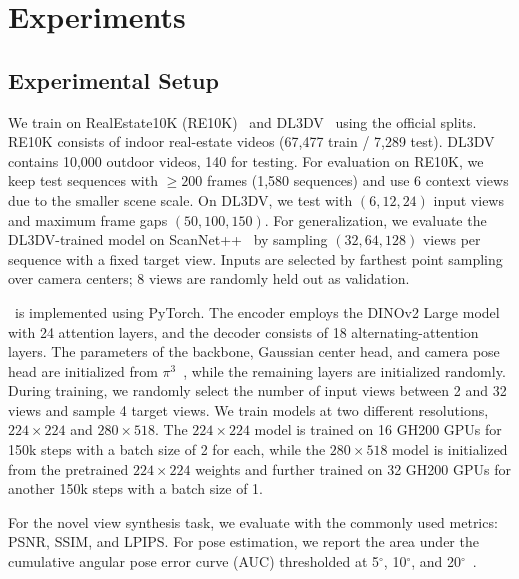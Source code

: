 
\vspace{-1mm}
\section{Experiments}
\vspace{-3mm}

\subsection{Experimental Setup}
\vspace{-3mm}



We train on RealEstate10K (RE10K)~\citep{re10k} and DL3DV~\citep{acid} using the official splits. RE10K consists of indoor real-estate videos (67,477 train / 7,289 test). DL3DV~\citep{dl3dv} contains 10,000 outdoor videos, 140 for testing.
For evaluation on RE10K, we keep test sequences with $\geq200$ frames (1,580 sequences) and use 6 context views due to the smaller scene scale. On DL3DV, we test with $(6,12,24)$ input views and maximum frame gaps $(50,100,150)$.
For generalization, we evaluate the DL3DV-trained model on ScanNet++~\citep{scannetpp} by sampling $(32,64,128)$ views per sequence with a fixed target view. Inputs are selected by farthest point sampling over camera centers; 8 views are randomly held out as validation.

\ourmethod~is implemented using PyTorch. The encoder employs the DINOv2 Large model~\citep{dinov2} with 24 attention layers, and the decoder consists of 18 alternating-attention layers.
The parameters of the backbone, Gaussian center head, and camera pose head are initialized from $\pi^3$~\citep{pi3}, while the remaining layers are initialized randomly. 
During training, we randomly select the number of input views between 2 and 32 views and sample 4 target views.
We train models at two different resolutions, $224\times224$ and $280\times518$. The $224\times224$ model is trained on 16 GH200 GPUs for 150k steps with a batch size of 2 for each, while the $280\times518$ model is initialized from the pretrained $224\times224$ weights and further trained on 32 GH200 GPUs for another 150k steps with a batch size of 1.


For the novel view synthesis task, we evaluate with the commonly used metrics: PSNR, SSIM, and LPIPS. 
For pose estimation, we report the area under the cumulative angular pose error curve (AUC) thresholded at 5$^\circ$, 10$^\circ$, and 20$^\circ$~\citep{superglue, roma}. 

